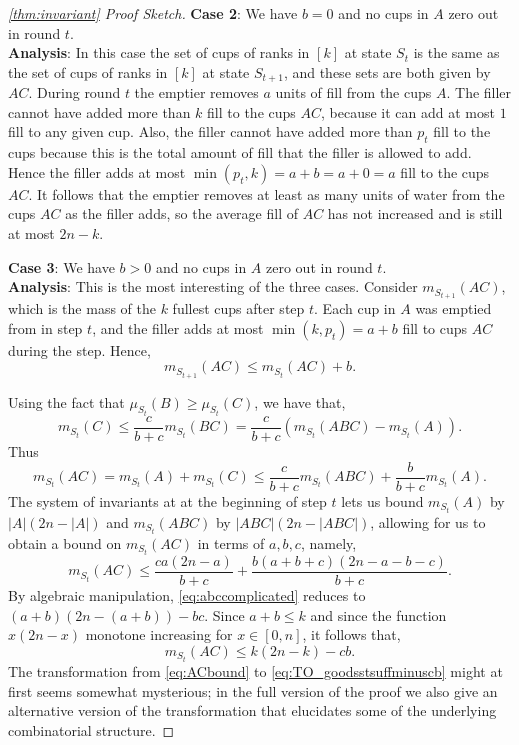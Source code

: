 \begin{proof}[\cref{thm:invariant} Proof Sketch]
\noindent\textbf{Case 2}:
We have $b = 0$ and no cups in $A$ zero out in round $t$.\\
\textbf{Analysis}: In this case the set of cups of ranks in $[k]$ at
state $S_t$ is the same as the set of cups of ranks in $[k]$ at state
$S_{t+1}$, and these sets are both given by $AC$. During round $t$ the
emptier removes $a$ units of fill from the cups $A$. The filler cannot
have added more than $k$ fill to the cups $AC$, because it can add at
most $1$ fill to any given cup. Also, the filler cannot have added
more than $p_t$ fill to the cups because this is the total amount of
fill that the filler is allowed to add. Hence the filler adds at most
$\min(p_t, k) = a+b=a+0=a$ fill to the cups $AC$. It follows that the
emptier removes at least as many units of water from the cups $AC$ as
the filler adds, so the average fill of $AC$ has not increased and is
still at most $2n-k$.

\vspace{.3 cm}

\noindent\textbf{Case 3}:
We have $b > 0$ and no cups in $A$ zero out in round $t$. \\
\textbf{Analysis}:
This is the most interesting of the three cases. Consider $m_{S_{t+1}}(AC)$, which is the mass of the $k$ fullest
cups after step $t$. Each cup in $A$ was emptied from in step $t$, and the
filler adds at most $\min(k, p_t) = a+b$ fill to cups $AC$ during the step. 
Hence, 
\begin{equation}
  \label{eq:TO_bplusmAC}
m_{S_{t+1}}(AC) \le m_{S_t}(AC) + b.
\end{equation}

Using the fact that $\mu_{S_t}(B) \ge \mu_{S_t}(C)$, we have that, 
$$m_{S_t}(C) \le \frac{c}{b+c} m_{S_t}(BC) = \frac{c}{b+c}(m_{S_t}(ABC) - m_{S_t}(A)).$$
Thus
\begin{equation}
  m_{S_{t}}(AC) = m_{S_t}(A) + m_{S_t}(C) \le \frac{c}{b+c}m_{S_t}(ABC) + \frac{b}{b+c}m_{S_t}(A).
  \label{eq:ACbound}
\end{equation} 
The system of invariants at at the beginning of step $t$ lets us bound $m_{S_t}(A)$ by $|A|(2n - |A|)$ and $m_{S_t}(ABC)$ by $|ABC|(2n - |ABC|)$, allowing for us to obtain a bound on $m_{S_{t}}(AC)$ in terms of $a, b, c$, namely, 
\begin{equation}
  m_{S_{t}}(AC) \le \frac{ca (2n - a)}{b+c} + \frac{b (a + b + c)(2n - a - b - c)}{b+c}.
  \label{eq:abccomplicated}
\end{equation}
By algebraic manipulation, \eqref{eq:abccomplicated} reduces to
$(a + b) (2n - (a + b)) - bc$. Since $a + b \le k$ and since the function $x(2n - x)$ monotone increasing for $x \in [0, n]$, it follows that,
\begin{equation}
  \label{eq:TO_goodsstsuffminuscb}
  m_{S_t}(AC) \le  k(2n-k)-cb.
\end{equation}
The transformation from \eqref{eq:ACbound} to \eqref{eq:TO_goodsstsuffminuscb} might at first seems somewhat mysterious; in the full version of the proof we also give an alternative version of the transformation that elucidates some of the underlying combinatorial structure.


\end{proof}
